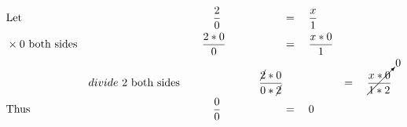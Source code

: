 \begin{alignat*}{3}
&\mathrm{Let}&&\qquad\quad\frac{2}{0}&&=\quad\frac{x}{1}\\
&\times\mathrm{0~both~sides}&&\qquad\frac{2*0}{0}&&=\quad\frac{x*0}{1}\\
&\,\,&divide\mathrm{~2~both~sides}&&\qquad\frac{\cancel{2}*0}{0*\cancel{2}}&&=\quad\cancelto{0}{\frac{x*0}{1*2}}\\
&\mathrm{Thus}&&\qquad\quad\frac{0}{0}&&=\quad0
\end{alignat*}
